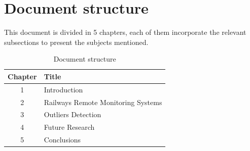 \section{Document structure}

This document is divided in 5 chapters, each of them incorporate the relevant subsections to present the subjects mentioned. 

\begin{table}[!h]
    \label{tb:struct}
    \centering
    \caption{Document structure}
    \vspace{0.2em}
    \begin{tabular}{c|l}%
    \textbf{Chapter} & \textbf{Title}                    \\ \hline
    1       &                   Introduction             \\ \hline
    2       &                   Railways Remote Monitoring Systems       \\ \hline
    3       &                   Outliers Detection    \\ \hline
    4       &                   Future Research    \\ \hline
    5       &                   Conclusions               \\
    \end{tabular}
\end{table}